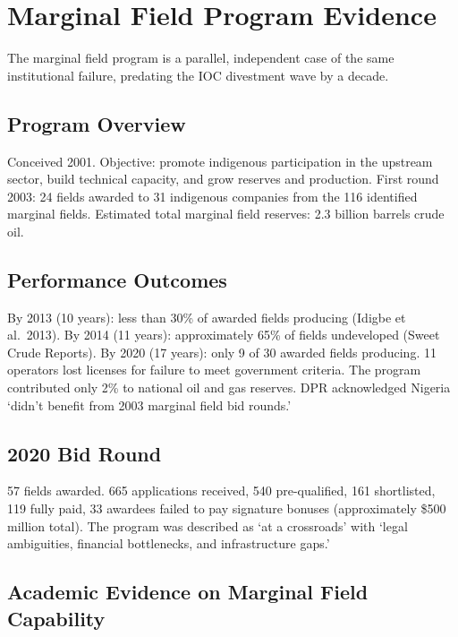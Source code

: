 \hypertarget{marginal-field-program-evidence}{%
\section{Marginal Field Program
Evidence}\label{marginal-field-program-evidence}}

The marginal field program is a parallel, independent case of the same
institutional failure, predating the IOC divestment wave by a decade.

\hypertarget{program-overview}{%
\subsection{Program Overview}\label{program-overview}}

Conceived 2001. Objective: promote indigenous participation in the
upstream sector, build technical capacity, and grow reserves and
production. First round 2003: 24 fields awarded to 31 indigenous
companies from the 116 identified marginal fields. Estimated total
marginal field reserves: 2.3 billion barrels crude oil.

\hypertarget{performance-outcomes}{%
\subsection{Performance Outcomes}\label{performance-outcomes}}

By 2013 (10 years): less than 30\% of awarded fields producing (Idigbe
et al.~2013). By 2014 (11 years): approximately 65\% of fields
undeveloped (Sweet Crude Reports). By 2020 (17 years): only 9 of 30
awarded fields producing. 11 operators lost licenses for failure to meet
government criteria. The program contributed only 2\% to national oil
and gas reserves. DPR acknowledged Nigeria `didn't benefit from 2003
marginal field bid rounds.'

\hypertarget{bid-round}{%
\subsection{2020 Bid Round}\label{bid-round}}

57 fields awarded. 665 applications received, 540 pre-qualified, 161
shortlisted, 119 fully paid, 33 awardees failed to pay signature bonuses
(approximately \$500 million total). The program was described as `at a
crossroads' with `legal ambiguities, financial bottlenecks, and
infrastructure gaps.'

\hypertarget{academic-evidence-on-marginal-field-capability}{%
\subsection{Academic Evidence on Marginal Field
Capability}\label{academic-evidence-on-marginal-field-capability}}

